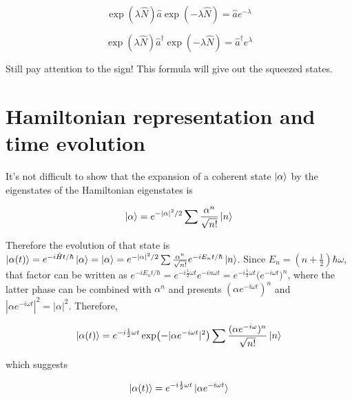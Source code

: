 \documentclass{article}
\begin{document}
        \begin{equation}
            \exp(\lambda\hat{N})\hat{a}\exp(-\lambda\hat{N}) = \hat{a} e^{-\lambda}
        \end{equation}

        \begin{equation}
            \exp(\lambda\hat{N})\hat{a}^\dagger\exp(-\lambda\hat{N}) = \hat{a}^\dagger e^{\lambda}
        \end{equation}

        Still pay attention to the sign! This formula will give out the squeezed states. 

    


    \section{Hamiltonian representation and time evolution}
    
        It's not difficult to show that the expansion of a coherent state $\ket{\alpha}$ by the eigenstates of the Hamiltonian eigenstates is 

        \begin{equation}
            \ket{\alpha} = e^{-|\alpha|^2/2} \sum \frac{\alpha^n}{\sqrt{n!}}\ket{n}
        \end{equation}

        Therefore the evolution of that state is $\ket{\alpha(t)}=e^{-i\hat{H}t/\hbar}\ket{\alpha}=\ket{\alpha} = e^{-|\alpha|^2/2} \sum \frac{\alpha^n}{\sqrt{n!}}e^{-iE_nt/\hbar}\ket{n}$. Since $E_n=(n+\frac{1}{2})\hbar\omega$, that factor can be written as $e^{-iE_nt/\hbar}=e^{-i\frac{1}{2}\omega t}e^{-in\omega t}=e^{-i\frac{1}{2}\omega t}\bigl(e^{-i\omega t}\bigr)^n$, where the latter phase can be combined with $\alpha^n$ and presents $(\alpha e^{-i\omega t})^n$ and $|\alpha e^{-i\omega t}|^2=|\alpha|^2$. Therefore, 

        \begin{equation}
            \ket{\alpha(t)} = e^{-i\frac{1}{2}\omega t} \exp\bigl(-|\alpha e^{-i\omega t}|^2\bigr) \sum \frac{(\alpha e^{-i\omega})^n}{\sqrt{n!}}\ket{n}
        \end{equation}

        which suggests 

        \begin{equation}
            \ket{\alpha(t)} = e^{-i\frac{1}{2}\omega t} \ket{\alpha e^{-i\omega t}}
        \end{equation}
\end{document}

